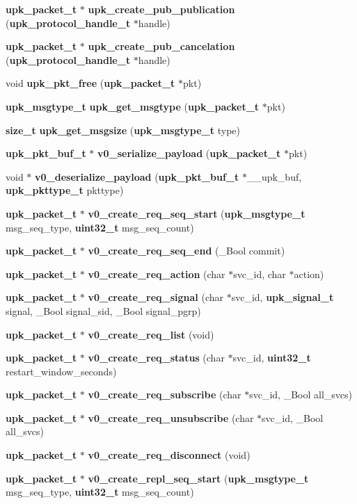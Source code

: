 \begin{DoxyCompactItemize}
\item 
{\bf upk\_\-packet\_\-t} $\ast$ {\bf upk\_\-create\_\-pub\_\-publication} ({\bf upk\_\-protocol\_\-handle\_\-t} $\ast$handle)
\item 
{\bf upk\_\-packet\_\-t} $\ast$ {\bf upk\_\-create\_\-pub\_\-cancelation} ({\bf upk\_\-protocol\_\-handle\_\-t} $\ast$handle)
\item 
void {\bf upk\_\-pkt\_\-free} ({\bf upk\_\-packet\_\-t} $\ast$pkt)
\item 
{\bf upk\_\-msgtype\_\-t} {\bf upk\_\-get\_\-msgtype} ({\bf upk\_\-packet\_\-t} $\ast$pkt)
\item 
{\bf size\_\-t} {\bf upk\_\-get\_\-msgsize} ({\bf upk\_\-msgtype\_\-t} type)
\item 
{\bf upk\_\-pkt\_\-buf\_\-t} $\ast$ {\bf v0\_\-serialize\_\-payload} ({\bf upk\_\-packet\_\-t} $\ast$pkt)
\item 
void $\ast$ {\bf v0\_\-deserialize\_\-payload} ({\bf upk\_\-pkt\_\-buf\_\-t} $\ast$\_\-\_\-upk\_\-buf, {\bf upk\_\-pkttype\_\-t} pkttype)
\item 
{\bf upk\_\-packet\_\-t} $\ast$ {\bf v0\_\-create\_\-req\_\-seq\_\-start} ({\bf upk\_\-msgtype\_\-t} msg\_\-seq\_\-type, {\bf uint32\_\-t} msg\_\-seq\_\-count)
\item 
{\bf upk\_\-packet\_\-t} $\ast$ {\bf v0\_\-create\_\-req\_\-seq\_\-end} (\_\-Bool commit)
\item 
{\bf upk\_\-packet\_\-t} $\ast$ {\bf v0\_\-create\_\-req\_\-action} (char $\ast$svc\_\-id, char $\ast$action)
\item 
{\bf upk\_\-packet\_\-t} $\ast$ {\bf v0\_\-create\_\-req\_\-signal} (char $\ast$svc\_\-id, {\bf upk\_\-signal\_\-t} signal, \_\-Bool signal\_\-sid, \_\-Bool signal\_\-pgrp)
\item 
{\bf upk\_\-packet\_\-t} $\ast$ {\bf v0\_\-create\_\-req\_\-list} (void)
\item 
{\bf upk\_\-packet\_\-t} $\ast$ {\bf v0\_\-create\_\-req\_\-status} (char $\ast$svc\_\-id, {\bf uint32\_\-t} restart\_\-window\_\-seconds)
\item 
{\bf upk\_\-packet\_\-t} $\ast$ {\bf v0\_\-create\_\-req\_\-subscribe} (char $\ast$svc\_\-id, \_\-Bool all\_\-svcs)
\item 
{\bf upk\_\-packet\_\-t} $\ast$ {\bf v0\_\-create\_\-req\_\-unsubscribe} (char $\ast$svc\_\-id, \_\-Bool all\_\-svcs)
\item 
{\bf upk\_\-packet\_\-t} $\ast$ {\bf v0\_\-create\_\-req\_\-disconnect} (void)
\item 
{\bf upk\_\-packet\_\-t} $\ast$ {\bf v0\_\-create\_\-repl\_\-seq\_\-start} ({\bf upk\_\-msgtype\_\-t} msg\_\-seq\_\-type, {\bf uint32\_\-t} msg\_\-seq\_\-count)

\end{DoxyCompactItemize}
